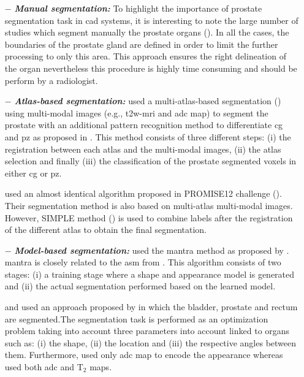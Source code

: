 \begin{enumerate}[leftmargin=*]

\item[$-$] \textbf{\textit{Manual segmentation:}} To highlight the importance of prostate segmentation task in \ac{cad} systems, it is interesting to note the large number of studies which segment manually the prostate organs (\cite{Artan2009,Artan2010,Matulewicz2013,Niaf2011,Niaf2012,Ozer2009,Ozer2010,Puech2009,Vos2008,Vos2008a}). In all the cases, the boundaries of the prostate gland are defined in order to limit the further processing to only this area. This approach ensures the right delineation of the organ nevertheless this procedure is highly time consuming and should be perform by a radiologist.

\item[$-$] \textbf{\textit{Atlas-based segmentation:}} \cite{Litjens2012} used a multi-atlas-based segmentation (\cite{Klein2008}) using multi-modal images (e.g., \ac{t2w}-\ac{mri} and \ac{adc} map) to segment the prostate with an additional pattern recognition method to differentiate \ac{cg} and \ac{pz} as proposed in \cite{Litjens2012a}. This method consists of three different steps: (i) the registration between each atlas and the multi-modal images, (ii) the atlas selection and finally (iii) the classification of the prostate segmented voxels in either \ac{cg} or \ac{pz}. 

  \cite{Litjens2014} used an almost identical algorithm proposed in PROMISE12 challenge (\cite{Litjens2014a}). Their segmentation method is also based on multi-atlas multi-modal images. However, SIMPLE method (\cite{Langerak2010}) is used to combine labels after the registration of the different atlas to obtain the final segmentation.

\item[$-$] \textbf{\textit{Model-based segmentation:}} \cite{Viswanath2008a,Viswanath2009} used the \ac{mantra} method as proposed by \cite{Toth2008}. \ac{mantra} is closely related to the \ac{asm} from \cite{Cootes1995}. This algorithm consists of two stages: (i) a training stage where a shape and appearance model is generated and (ii) the actual segmentation performed based on the learned model. 

  \cite{Litjens2011} and \cite{Vos2012} used an approach proposed by \cite{Huisman2010} in which the bladder, prostate and rectum are segmented.The segmentation task is performed as an optimization problem taking into account three parameters into account linked to organs such as: (i) the shape, (ii) the location and (iii) the respective angles between them. Furthermore, \cite{Litjens2011} used only \ac{adc} map to encode the appearance whereas \cite{Vos2012} used both \ac{adc} and T$_2$ maps.

\end{enumerate}

